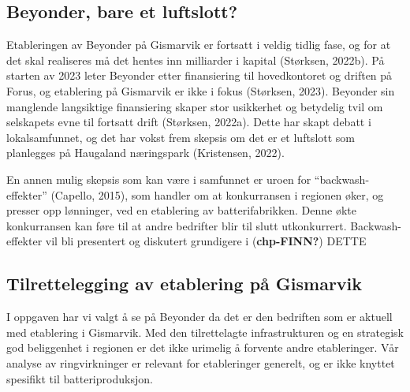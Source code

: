 \documentclass[
]{article}
\begin{document}
\hypertarget{beyonder-bare-et-luftslott}{%
\subsection{Beyonder, bare et
luftslott?}\label{beyonder-bare-et-luftslott}}

Etableringen av Beyonder på Gismarvik er fortsatt i veldig tidlig fase,
og for at det skal realiseres må det hentes inn milliarder i kapital
(Størksen, 2022b). På starten av 2023 leter Beyonder etter finansiering
til hovedkontoret og driften på Forus, og etablering på Gismarvik er
ikke i fokus (Størksen, 2023). Beyonder sin manglende langsiktige
finansiering skaper stor usikkerhet og betydelig tvil om selskapets evne
til fortsatt drift (Størksen, 2022a). Dette har skapt debatt i
lokalsamfunnet, og det har vokst frem skepsis om det er et luftslott som
planlegges på Haugaland næringspark (Kristensen, 2022).

En annen mulig skepsis som kan være i samfunnet er uroen for
``backwash-effekter'' (Capello, 2015), som handler om at konkurransen i
regionen øker, og presser opp lønninger, ved en etablering av
batterifabrikken. Denne økte konkurransen kan føre til at andre
bedrifter blir til slutt utkonkurrert. Backwash-effekter vil bli
presentert og diskutert grundigere i (\textbf{chp-FINN?}) DETTE

\hypertarget{tilrettelegging-av-etablering-puxe5-gismarvik}{%
\subsection{Tilrettelegging av etablering på
Gismarvik}\label{tilrettelegging-av-etablering-puxe5-gismarvik}}

I oppgaven har vi valgt å se på Beyonder da det er den bedriften som er
aktuell med etablering i Gismarvik. Med den tilrettelagte
infrastrukturen og en strategisk god beliggenhet i regionen er det ikke
urimelig å forvente andre etableringer. Vår analyse av ringvirkninger er
relevant for etableringer generelt, og er ikke knyttet spesifikt til
batteriproduksjon.
\end{document}
